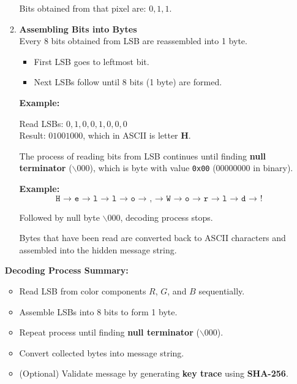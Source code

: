 \documentclass{ittelkom}
\begin{document}
\begin{enumerate}
\begin{enumerate}
                    \noindent
                    Bits obtained from that pixel are: $0, 1, 1$.

              \item \textbf{Assembling Bits into Bytes} \\
                    Every 8 bits obtained from LSB are reassembled into 1 byte.
                    \begin{itemize}
                        \item First LSB goes to leftmost bit.
                        \item Next LSBs follow until 8 bits (1 byte) are formed.
                    \end{itemize}

                    \noindent
                    \textbf{Example:}
                    \begin{center}
                        Read LSBs: $0, 1, 0, 0, 1, 0, 0, 0$ \\
                        Result: $01001000$, which in ASCII is letter \textbf{H}.
                    \end{center}

                    The process of reading bits from LSB continues until finding \textbf{null
                        terminator} ($\backslash 000$), which is byte with value \texttt{0x00}
                    ($00000000$ in binary).

                    \noindent
                    \textbf{Example:}
                    \[
                        \texttt{H → e → l → l → o → , → W → o → r → l → d → !}
                    \]

                    Followed by null byte $\backslash 000$, decoding process stops.

                    Bytes that have been read are converted back to ASCII characters and assembled
                    into the hidden message string.

          \end{enumerate}

          \noindent
          \textbf{Decoding Process Summary:}
          \begin{itemize}
              \item Read LSB from color components $R$, $G$, and $B$ sequentially.
              \item Assemble LSBs into 8 bits to form 1 byte.
              \item Repeat process until finding \textbf{null terminator} ($\backslash 000$).
              \item Convert collected bytes into message string.
              \item (Optional) Validate message by generating \textbf{key trace} using \textbf{SHA-256}.
          \end{itemize}

\end{enumerate}
\end{document}
